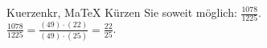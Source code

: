 \begin{MAufgabe}{Kuerzen}{kr, MaTeX}
K\"urzen Sie soweit m\"oglich: $\frac{1078}{1225}$.\\ 
\ifLsg\MLoesung
\quad $\frac{1078}{1225}=\frac{(49)\cdot(22)}{(49)\cdot(25)}=\frac{22}{25}$.\else\relax\fi
 \end{MAufgabe}